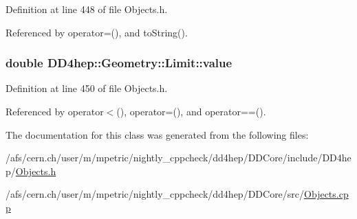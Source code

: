 Definition at line 448 of file Objects.h.

Referenced by operator=(), and toString().\hypertarget{class_d_d4hep_1_1_geometry_1_1_limit_af3c5aac5f2991f137749634caf9e49cc}{
\subsubsection[{value}]{\setlength{\rightskip}{0pt plus 5cm}double {\bf DD4hep::Geometry::Limit::value}}}
\label{class_d_d4hep_1_1_geometry_1_1_limit_af3c5aac5f2991f137749634caf9e49cc}


Definition at line 450 of file Objects.h.

Referenced by operator$<$(), operator=(), and operator==().

The documentation for this class was generated from the following files:\begin{DoxyCompactItemize}
\item 
/afs/cern.ch/user/m/mpetric/nightly\_\-cppcheck/dd4hep/DDCore/include/DD4hep/\hyperlink{_objects_8h}{Objects.h}\item 
/afs/cern.ch/user/m/mpetric/nightly\_\-cppcheck/dd4hep/DDCore/src/\hyperlink{_objects_8cpp}{Objects.cpp}\end{DoxyCompactItemize}
